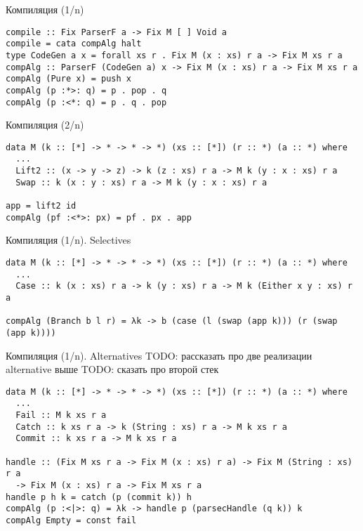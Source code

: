 \documentclass[aspectratio=169
  , xcolor={svgnames}
  , hyperref={ colorlinks,citecolor=Blue
             , linkcolor=DarkRed,urlcolor=DarkBlue}
  , russian
  ]{beamer}
\begin{document}
\begin{frame}[fragile]{Компиляция (1/n)}
\begin{verbatim}
compile :: Fix ParserF a -> Fix M [ ] Void a
compile = cata compAlg halt
type CodeGen a x = forall xs r . Fix M (x : xs) r a -> Fix M xs r a
compAlg :: ParserF (CodeGen a) x -> Fix M (x : xs) r a -> Fix M xs r a
compAlg (Pure x) = push x
compAlg (p :*>: q) = p . pop . q
compAlg (p :<*: q) = p . q . pop
\end{verbatim}
\end{frame}

\begin{frame}[fragile]{Компиляция (2/n)}
\begin{verbatim}
data M (k :: [*] -> * -> * -> *) (xs :: [*]) (r :: *) (a :: *) where
  ...
  Lift2 :: (x -> y -> z) -> k (z : xs) r a -> M k (y : x : xs) r a
  Swap :: k (x : y : xs) r a -> M k (y : x : xs) r a
  
app = lift2 id
compAlg (pf :<*>: px) = pf . px . app

\end{verbatim}
\end{frame}

\begin{frame}[fragile]{Компиляция (1/n). Selectives }
\begin{verbatim}
data M (k :: [*] -> * -> * -> *) (xs :: [*]) (r :: *) (a :: *) where
  ...
  Case :: k (x : xs) r a -> k (y : xs) r a -> M k (Either x y : xs) r a
  
compAlg (Branch b l r) = λk -> b (case (l (swap (app k))) (r (swap (app k))))

\end{verbatim}
\end{frame}

\begin{frame}[fragile]{Компиляция (1/n). Alternatives}
TODO: рассказать про две реализации alternative выше
TODO: сказать про второй стек
\begin{verbatim}
data M (k :: [*] -> * -> * -> *) (xs :: [*]) (r :: *) (a :: *) where
  ...
  Fail :: M k xs r a
  Catch :: k xs r a -> k (String : xs) r a -> M k xs r a
  Commit :: k xs r a -> M k xs r a
  
handle :: (Fix M xs r a -> Fix M (x : xs) r a) -> Fix M (String : xs) r a
  -> Fix M (x : xs) r a -> Fix M xs r a
handle p h k = catch (p (commit k)) h
compAlg (p :<|>: q) = λk -> handle p (parsecHandle (q k)) k
compAlg Empty = const fail
\end{verbatim}
\end{frame}
\end{document}
